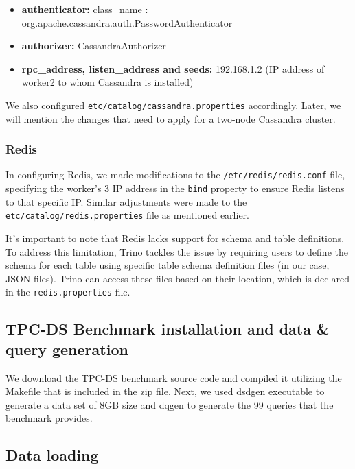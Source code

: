 \documentclass[conference]{IEEEtran}
\begin{document}
\begin{itemize}
    \item \textbf{authenticator:} class\_name : org.apache.cassandra.auth.PasswordAuthenticator
    \item \textbf{authorizer:} CassandraAuthorizer
    \item \textbf{rpc\_address, listen\_address and seeds:} 192.168.1.2 (IP address of worker2 to whom Cassandra is installed)
\end{itemize}

We also configured \texttt{etc/catalog/cassandra.properties} accordingly. Later, we will mention the changes that need to apply for a two-node Cassandra cluster.

\subsubsection{Redis}


In configuring Redis, we made modifications to the \texttt{/etc/redis/redis.conf} file, specifying the worker's 3 IP address in the \texttt{bind} property 
to ensure Redis listens to that specific IP. Similar adjustments were made to the \texttt{etc/catalog/redis.properties} file as mentioned earlier.

It's important to note that Redis lacks support for schema and table definitions. To address this limitation, Trino tackles the issue by requiring users to 
define the schema for each table using specific table schema definition files (in our case, JSON files). Trino can access these files based on their location, which is declared in the \texttt{redis.properties} file.

\subsection{TPC-DS Benchmark installation and data \& query generation}

We download the \textcolor{linkblue}{\underline{\href{https://www.tpc.org/tpc_documents_current_versions/current_specifications5.asp}{TPC-DS benchmark source code}}} and compiled it
utilizing the Makefile that is included in the zip file. Next, we used dsdgen executable to generate a data set of 8GB size and dqgen to generate the 99 queries that the benchmark provides.

\subsection{Data loading}
\end{document}
